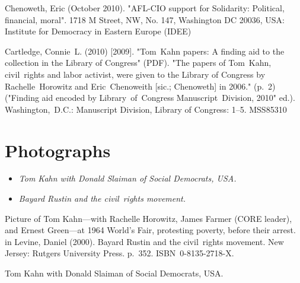Chenoweth, Eric (October 2010). "AFL-CIO support for Solidarity:
Political, financial, moral". 1718 M Street, NW, No. 147, Washington DC
20036, USA: Institute for Democracy in Eastern Europe (IDEE)

Cartledge, Connie~L. (2010) {[}2009{]}. "Tom~Kahn papers: A finding aid
to the collection in the Library of Congress" (PDF). "The papers of
Tom~Kahn, civil~rights and labor activist, were given to the Library of
Congress by Rachelle~Horowitz and Eric~Chenoweith {[}sic.; Chenoweth{]}
in 2006." (p.~2) ("Finding aid encoded by Library~of~Congress
Manuscript~Division, 2010" ed.). Washington,~D.C.: Manuscript Division,
Library of Congress: 1--5. MSS85310

\section{Photographs}\label{photographs}

\begin{itemize}
\item
  \emph{Tom Kahn with Donald Slaiman of Social Democrats, USA.}
\item
  \emph{Bayard Rustin and the civil~rights movement.}
\end{itemize}

Picture of Tom Kahn---with Rachelle Horowitz, James Farmer (CORE
leader), and Ernest Green---at 1964 World's Fair, protesting poverty,
before their arrest. in Levine, Daniel (2000). Bayard Rustin and the
civil~rights movement. New Jersey: Rutgers University Press. p.~352.
ISBN~0-8135-2718-X.

Tom Kahn with Donald Slaiman of Social Democrats, USA.
